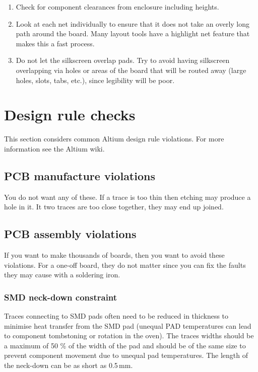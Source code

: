 \begin{enumerate}
\item Check for component clearances from enclosure including heights.

\item Look at each net individually to ensure that it does not take an
  overly long path around the board. Many layout tools have a
  highlight net feature that makes this a fast process.

\item Do not let the silkscreen overlap pads. Try to avoid having
  silkscreen overlapping via holes or areas of the board that will be
  routed away (large holes, slots, tabs, etc.), since legibility will
  be poor.

 \end{enumerate}



\section{Design rule checks}


This section considers common Altium design rule violations.  For more
information see the Altium wiki.



\subsection{PCB manufacture violations}

You do not want any of these.  If a trace is too thin then etching may
produce a hole in it.  It two traces are too close together, they may
end up joined.


\subsection{PCB assembly violations}

If you want to make thousands of boards, then you want to avoid these
violations.  For a one-off board, they do not matter since you can fix
the faults they may cause with a soldering iron.

\subsubsection{SMD neck-down constraint}

Traces connecting to SMD pads often need to be reduced in thickness to
minimise heat transfer from the SMD pad (unequal PAD temperatures can
lead to component tombstoning or rotation in the oven).  The traces
widths should be a maximum of 50 \% of the width of the pad and should
be of the same size to prevent component movement due to unequal pad
temperatures.  The length of the neck-down can be as short as 0.5\,mm.

